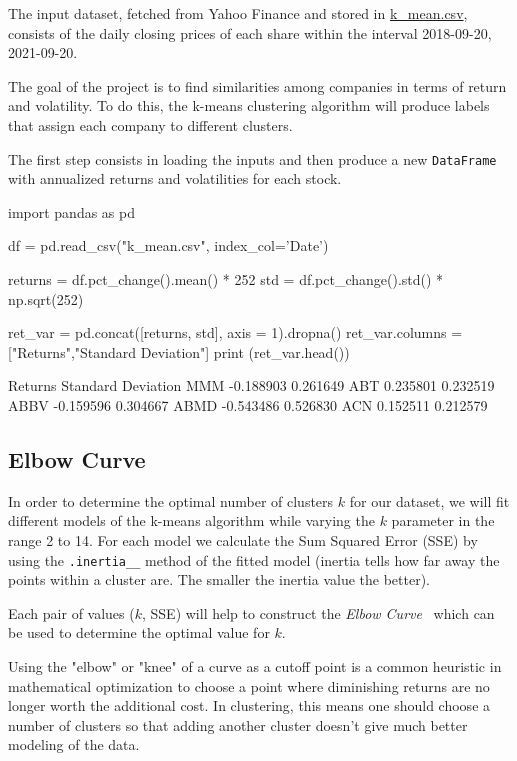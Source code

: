 The input dataset, fetched from Yahoo Finance and stored in \href{https://github.com/matteosan1/finance_course/raw/develop/libro/input_files/k\_mean.csv}{k\_mean.csv}, consists of the daily closing prices of each share within the interval 2018-09-20, 2021-09-20.
    
The goal of the project is to find similarities among companies in terms of return and volatility. To do this, the k-means clustering algorithm will produce labels that assign each company to different clusters.
 
The first step consists in loading the inputs and then produce a new \texttt{DataFrame} with annualized returns and volatilities for each stock. 
 
\begin{ipython}
import pandas as pd
 
df = pd.read_csv("k_mean.csv", index_col='Date')
 
returns = df.pct_change().mean() * 252
std = df.pct_change().std() * np.sqrt(252)
 
ret_var = pd.concat([returns, std], axis = 1).dropna()
ret_var.columns = ["Returns","Standard Deviation"]
print (ret_var.head())
\end{ipython}
\begin{ioutput}
       Returns  Standard Deviation
MMM  -0.188903            0.261649
ABT   0.235801            0.232519
ABBV -0.159596            0.304667
ABMD -0.543486            0.526830
ACN   0.152511            0.212579
\end{ioutput}

\subsection{Elbow Curve}
 
In order to determine the optimal number of clusters $k$ for our dataset, we will fit different models of the k-means algorithm while varying the $k$ parameter in the range 2 to 14. For each model we calculate the Sum Squared Error (SSE) by using the \texttt{.inertia\_\_} method of the fitted model (inertia tells how far away the points within a cluster are. The smaller the inertia value the better).
 
Each pair of values ($k$, SSE) will help to construct the \emph{Elbow Curve}~\cite{bib:elbow_curve} which can be used to determine the optimal value for $k$. 
 
Using the "elbow" or "knee" of a curve as a cutoff point is a common heuristic in mathematical optimization to choose a point where diminishing returns are no longer worth the additional cost. In clustering, this means one should choose a number of clusters so that adding another cluster doesn't give much better modeling of the data.
 

